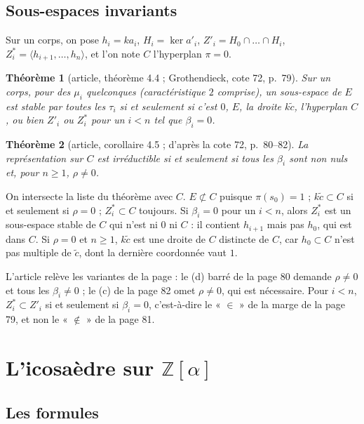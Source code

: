 \documentclass[11pt,a4paper]{amsart}
\theoremstyle{definition}
\theoremstyle{plain}
\newtheorem{theoreme}{Théorème}
\theoremstyle{remark}
\newcommand{\Z}{\mathbb Z}
\begin{document}
\subsection{Sous-espaces invariants}

Sur un corps, on pose $h_i = ka_i$, $H_i = \ker a'_i$, $Z'_i = H_0 \cap \dots \cap H_i$, $Z^*_i = \langle h_{i+1}, \dots, h_n\rangle$, et l'on note $C$ l'hyperplan $\pi = 0$.

\begin{theoreme}[article, théorème 4.4 ; Grothendieck, cote 72, p.~79]
Sur un corps, pour des $\mu_i$ quelconques (caractéristique $2$ comprise), un sous-espace de $E$ est stable par toutes les $\tau_i$ si et seulement si c'est $0$, $E$, la droite $k\tilde c$, l'hyperplan $C$, ou bien $Z'_i$ ou $Z^*_i$ pour un $i < n$ tel que $\beta_i = 0$.
\end{theoreme}

\begin{theoreme}[article, corollaire 4.5 ; d'après la cote 72, p.~80--82]
La représentation sur $C$ est irréductible si et seulement si tous les $\beta_i$ sont non nuls et, pour $n \ge 1$, $\rho \ne 0$.
\end{theoreme}

On intersecte la liste du théorème avec $C$. $E \not\subset C$ puisque $\pi(s_0) = 1$ ; $k\tilde c \subset C$ si et seulement si $\rho = 0$ ; $Z^*_i \subset C$ toujours. Si $\beta_i = 0$ pour un $i < n$, alors $Z^*_i$ est un sous-espace stable de $C$ qui n'est ni $0$ ni $C$ : il contient $h_{i+1}$ mais pas $h_0$, qui est dans $C$. Si $\rho = 0$ et $n \ge 1$, $k\tilde c$ est une droite de $C$ distincte de $C$, car $h_0 \subset C$ n'est pas multiple de $\tilde c$, dont la dernière coordonnée vaut $1$.

L'article relève les variantes de la page : le (d) barré de la page 80 demande $\rho \ne 0$ et tous les $\beta_i \ne 0$ ; le (c) de la page 82 omet $\rho \ne 0$, qui est nécessaire. Pour $i < n$, $Z^*_i \subset Z'_i$ si et seulement si $\beta_i = 0$, c'est-à-dire le « $\in$ » de la marge de la page 79, et non le « $\notin$ » de la page 81.

\section{L'icosaèdre sur \texorpdfstring{$\Z[\alpha]$}{Z[alpha]}}

\subsection{Les formules}
\end{document}
